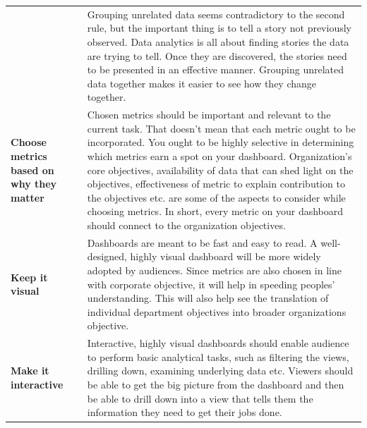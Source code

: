 \documentclass[]{book}
\begin{document}
\begin{longtable}[]{@{}ll@{}}
\begin{minipage}[t]{0.17\columnwidth}
\end{minipage} & \begin{minipage}[t]{0.77\columnwidth}\raggedright
Grouping unrelated data seems contradictory to the second rule, but the important thing is to tell a story not previously observed. Data analytics is all about finding stories the data are trying to tell. Once they are discovered, the stories need to be presented in an effective manner. Grouping unrelated data together makes it easier to see how they change together.\strut
\end{minipage}\tabularnewline
\begin{minipage}[t]{0.17\columnwidth}\raggedright
\textbf{Choose metrics based on why they matter}\strut
\end{minipage} & \begin{minipage}[t]{0.77\columnwidth}\raggedright
Chosen metrics should be important and relevant to the current task. That doesn't mean that each metric ought to be incorporated. You ought to be highly selective in determining which metrics earn a spot on your dashboard. Organization's core objectives, availability of data that can shed light on the objectives, effectiveness of metric to explain contribution to the objectives etc. are some of the aspects to consider while choosing metrics. In short, every metric on your dashboard should connect to the organization objectives.\strut
\end{minipage}\tabularnewline
\begin{minipage}[t]{0.17\columnwidth}\raggedright
\textbf{Keep it visual}\strut
\end{minipage} & \begin{minipage}[t]{0.77\columnwidth}\raggedright
Dashboards are meant to be fast and easy to read. A well-designed, highly visual dashboard will be more widely adopted by audiences. Since metrics are also chosen in line with corporate objective, it will help in speeding peoples' understanding. This will also help see the translation of individual department objectives into broader organizations objective.\strut
\end{minipage}\tabularnewline
\begin{minipage}[t]{0.17\columnwidth}\raggedright
\textbf{Make it interactive}\strut
\end{minipage} & \begin{minipage}[t]{0.77\columnwidth}\raggedright
Interactive, highly visual dashboards should enable audience to perform basic analytical tasks, such as filtering the views, drilling down, examining underlying data etc. Viewers should be able to get the big picture from the dashboard and then be able to drill down into a view that tells them the information they need to get their jobs done.\strut

\end{minipage}
\end{longtable}
\end{document}

